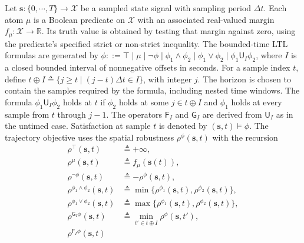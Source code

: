 \subsubsection{}
\label{ch06:subsubsec:stl_robustness}

\begin{revision}
Let $\mathbf{s}:\{0,\cdots,T\}\rightarrow\mathcal{X}$ be a sampled state
signal with sampling period $\Delta t$. Each atom $\mu$ is a Boolean
predicate on $\mathcal{X}$ with an associated real-valued margin
$f_\mu:\mathcal{X}\rightarrow\mathbb{R}$. Its truth value is obtained by
testing that margin against zero, using the predicate's specified strict
or non-strict inequality. The bounded-time LTL formulas are generated by
$\phi ::= \top \mid \mu \mid \lnot \phi \mid \phi_1 \wedge \phi_2
\mid \phi_1 \vee \phi_2 \mid \phi_1 \mathsf{U}_I \phi_2$,
where $I$ is a closed bounded interval of nonnegative offsets in seconds.
For a sample index $t$, define $t\oplus I\triangleq
\{j\ge t\mid (j-t)\Delta t\in I\}$, with integer $j$.
The horizon is chosen to contain the samples required by the formula,
including nested time windows.
The formula $\phi_1\mathsf{U}_I\phi_2$ holds at $t$ if $\phi_2$ holds
at some $j\in t\oplus I$ and $\phi_1$ holds at every sample from $t$
through $j-1$. The operators $\mathsf{F}_I$ and $\mathsf{G}_I$ are
derived from $\mathsf{U}_I$ as in the untimed case.
Satisfaction at sample $t$ is denoted by $(\mathbf{s},t)\models\phi$.
The trajectory objective uses the spatial robustness
$\rho^\phi(\mathbf{s},t)$ with the recursion
\begin{equation}
\label{ch06:eq:stl-robustness}
\begin{aligned}
\rho^\top(\mathbf{s},t)
&\triangleq +\infty, \\
\rho^\mu(\mathbf{s},t)
&\triangleq f_\mu(\mathbf{s}(t)), \\
\rho^{\lnot\phi}(\mathbf{s},t)
&\triangleq -\rho^\phi(\mathbf{s},t), \\
\rho^{\phi_1\wedge\phi_2}(\mathbf{s},t)
&\triangleq \min\big\{
\rho^{\phi_1}(\mathbf{s},t),\rho^{\phi_2}(\mathbf{s},t)\big\}, \\
\rho^{\phi_1\vee\phi_2}(\mathbf{s},t)
&\triangleq \max\big\{
\rho^{\phi_1}(\mathbf{s},t),\rho^{\phi_2}(\mathbf{s},t)\big\}, \\
\rho^{\mathsf{G}_I\phi}(\mathbf{s},t)
&\triangleq \min_{t'\in t\oplus I}\rho^\phi(\mathbf{s},t'), \\
\rho^{\mathsf{F}_I\phi}(\mathbf{s},t)

\end{aligned}
\end{equation}
\end{revision}
